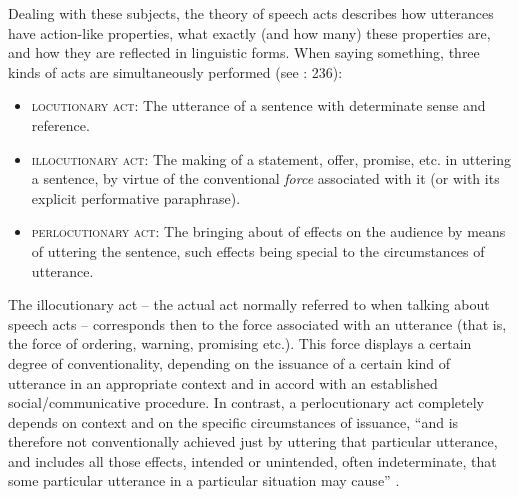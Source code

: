 Dealing with these subjects, the theory of speech acts describes how utterances have action-like properties, what exactly (and how many) these properties are, and how they are reflected in linguistic forms. When saying something, three kinds of acts are simultaneously performed (see \citealt{Levinson1983}: 236):

\begin{itemize}
    
\item \textsc{locutionary} \textsc{act}:    The utterance of a sentence with determinate sense and reference.

\item \textsc{illocutionary} \textsc{act}: The making of a statement, offer, promise, etc. in uttering a sentence, by virtue of the conventional \textit{force} associated with it (or with its explicit performative paraphrase).

\item \textsc{perlocutionary} \textsc{act}: The bringing about of effects on the audience by means of uttering the sentence, such effects being special to the circumstances of utterance.

\end{itemize}

The illocutionary act – the actual act normally referred to when talking about speech acts – corresponds then to the force associated with an utterance (that is, the force of ordering, warning, promising etc.). This force displays a certain degree of conventionality, depending on the issuance of a certain kind of utterance in an appropriate context and in accord with an established social/communicative procedure. In contrast, a perlocutionary act completely depends on context and on the specific circumstances of issuance, “and is therefore not conventionally achieved just by uttering that particular utterance, and includes all those effects, intended or unintended, often indeterminate, that some particular utterance in a particular situation may cause” \citep[237]{Levinson1983}.

